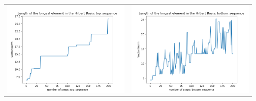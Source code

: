 \documentclass[10pt]{article}
\begin{document}
\begin{tabular}{c|c}
\begin{minipage}{.45\textwidth}
\includegraphics[width=\textwidth]{"DATA/5d/6 generators 2 bound C/top_sequence LENGTH"}
\end{minipage} &
\begin{minipage}{.45\textwidth}
\includegraphics[width=\textwidth]{"DATA/5d/6 generators 2 bound C bottomup/bottom_sequence LENGTH"}
\end{minipage}
\end{tabular}
\end{document}
